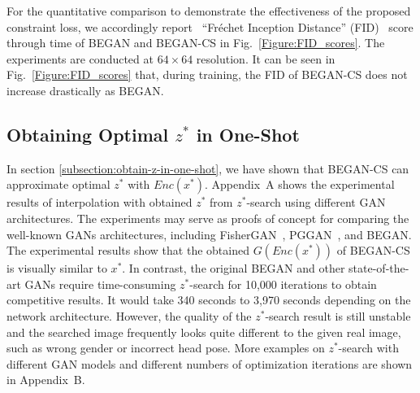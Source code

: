 \documentclass[runningheads]{llncs}
\begin{document}
    For the quantitative comparison to demonstrate the effectiveness of the proposed constraint loss, we accordingly report \, ``Fréchet Inception Distance'' (FID)~\cite{HeuselRUNH17} score through time of BEGAN and BEGAN-CS in Fig.~\ref{Figure:FID_scores}. The experiments are conducted at $64\times 64$ resolution. It can be seen in Fig.~\ref{Figure:FID_scores} that, during training, the FID of BEGAN-CS does not increase drastically as BEGAN. 
    
    \subsection{Obtaining Optimal $z^*$ in One-Shot}
    
    In section \ref{subsection:obtain-z-in-one-shot}, we have shown that BEGAN-CS can approximate optimal $z^*$ with $Enc(x^*)$.  Appendix~A shows the experimental results of interpolation with obtained $z^*$ from $z^*$-search using different GAN architectures. The experiments may serve as proofs of concept for comparing the well-known GANs architectures, including FisherGAN~\cite{FisherGAN}, PGGAN~\cite{PGGAN}, and BEGAN. The experimental results show that the obtained $G(Enc(x^*))$ of BEGAN-CS is visually similar to $x^*$. In contrast, the original BEGAN and other state-of-the-art GANs require time-consuming $z^*$-search for 10{,}000 iterations to obtain competitive results. It would take 340 seconds to 3{,}970 seconds depending on the network architecture. However, the quality of the $z^*$-search result is still unstable and the searched image frequently looks quite different to the given real image, such as wrong gender or incorrect head pose. More examples on $z^*$-search with different GAN models and different numbers of optimization iterations are shown in Appendix~B.
    
\end{document}
